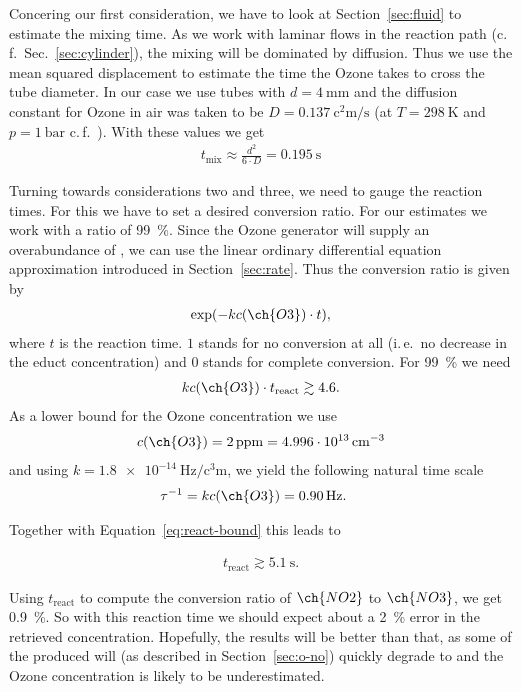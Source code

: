 Concering our first consideration, we have to look at
Section~\ref{sec:fluid} to estimate the mixing time. As we work with
laminar flows in the reaction path (c.\,f.\ Sec.~\ref{sec:cylinder}),
the mixing will be dominated by diffusion. Thus we use the mean
squared displacement to estimate the time the Ozone takes to cross the
tube diameter. In our case we use tubes with $d =
\SI{4}{\milli\meter}$ and the diffusion constant for Ozone in air was
taken to be $D = \SI{0.137}{\square\centi\meter\per\second}$ (at $T =
\SI{298}{\kelvin}$ and $p = \SI{1}{\text{bar}}$
c.\,f.~\cite{diff-ozone}). With these values we get
\begin{align*}
  t_{\text{mix}} \approx \frac{d^2}{6\cdot D} = \SI{0.195}{\second}
\end{align*}

Turning towards considerations two and three, we need to gauge the
reaction times. For this we have to set a desired conversion
ratio. For our estimates we work with a ratio of \SI{99}{\%}. 
Since the Ozone generator will supply an
overabundance of , we can use the linear ordinary
differential equation approximation introduced in
Section~\ref{sec:rate}. Thus the conversion ratio is
given by
\begin{align*}
  \exp(-kc(\ch{O3})\cdot t),
\end{align*}
where $t$ is the reaction time. $1$ stands for no
conversion at all (i.\,e.\ no decrease in the educt concentration) and
$0$ stands for complete conversion. For \SI{99}{\%} we need
\begin{align}
  kc(\ch{O3}) \cdot t_{\text{react}} \gtrsim 4.6. \label{eq:react-bound}
\end{align}
As a lower bound for the Ozone concentration we use
\begin{align*}
  c(\ch{O3}) = \SI{2}{ppm} = \SI{4.996e13}{\per\cubic\centi\meter} 
\end{align*}
and using $k = \SI{1.8e-14}{\hertz\per\cubic\centi\meter}$, we yield
the following natural time scale
\begin{align*}
  \tau^{-1} & = k c(\ch{O3}) = \SI{0.90}{\hertz}.
\end{align*}

Together with Equation~\eqref{eq:react-bound} this leads to

\begin{align*}
  t_{\text{react}} \gtrsim \SI{5.1}{\second}.
\end{align*}

Using $t_{\text{react}}$ to compute the conversion ratio of
$\ch{NO2}$ to $\ch{NO3}$, we get \SI{0.9}{\%}. So with this reaction
time we should expect about a \SI{2}{\%} error in the retrieved
 concentration. Hopefully, the results will be better than
that, as some of the produced  will (as described in
Section~\ref{sec:o-no}) quickly degrade to  and the Ozone
concentration is likely to be underestimated.

